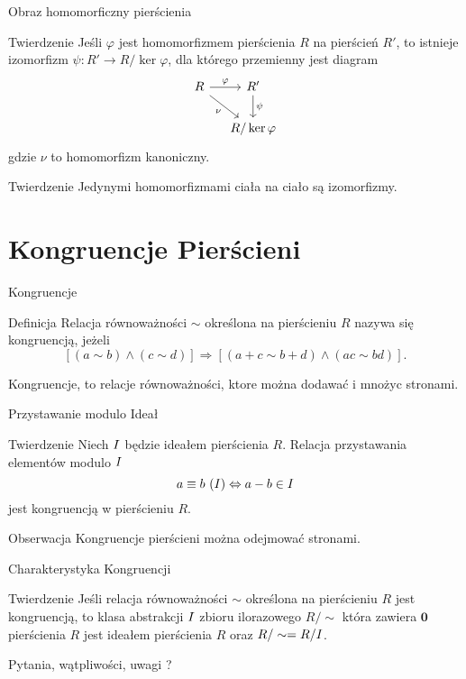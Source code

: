 \documentclass{beamer}
\newcommand{\zero}{\mathbf{0}}
\newcommand{\II}{\mathnormal{I}}
\let\phi\varphi
\begin{document}
\begin{frame}{Obraz homomorficzny pierścienia}
    \begin{block}{Twierdzenie}
        Jeśli $\phi$ jest homomorfizmem pierścienia $R$ na pierścień $R'$, to istnieje izomorfizm $\psi : R' \rightarrow R/\ker\phi$,
        dla którego przemienny jest diagram 
        $$
            \begin{tikzcd}[ampersand replacement=\&, column sep=small]
                R \arrow[r, "\phi"]  \arrow[rd, "\nu"'] \& R' \arrow[d, "\psi"] \\
                \& R / \ker \phi
            \end{tikzcd}
        $$   
        gdzie $\nu$ to homomorfizm kanoniczny.
    \end{block}
    \pause
    \begin{block}{Twierdzenie}
        Jedynymi homomorfizmami ciała na ciało są izomorfizmy. 
    \end{block}
\end{frame}

\section{Kongruencje Pierścieni}
\begin{frame}{Kongruencje}
    \begin{block}{Definicja}
        Relacja równoważności $\sim$ określona na pierścieniu $R$ nazywa się \alert{kongruencją}, jeżeli 
        $$[(a \sim b) \land (c \sim d)] \Rightarrow [(a+c \sim b+d) \land (ac \sim bd)].$$
    \end{block}
    Kongruencje, to relacje równoważności, ktore można dodawać i mnożyc stronami.
\end{frame}

\begin{frame}{Przystawanie modulo Ideał}
    \begin{block}{Twierdzenie}
        Niech $\II$ będzie ideałem pierścienia $R$. Relacja przystawania elementów modulo $\II$
        $$ a \equiv b \ (\II) \Leftrightarrow a - b \in \II$$ 
        jest kongruencją w pierścieniu $R$. 
    \end{block}
    \pause
    \begin{alertblock}{Obserwacja}
        Kongruencje pierścieni można odejmować stronami. 
    \end{alertblock}
\end{frame}

\begin{frame}{Charakterystyka Kongruencji}
    \begin{block}{Twierdzenie}
        Jeśli relacja równoważności $\sim$ określona na pierścieniu $R$ jest kongruencją, to klasa abstrakcji $\II$ zbioru ilorazowego $R/\sim$ która zawiera $\zero$ pierścienia $R$ jest ideałem pierścienia $R$ oraz $R/\sim = R/\II$.
    \end{block}
\end{frame}

\begin{frame}
    \centering 
    \LARGE Pytania, wątpliwości, uwagi ? 
\end{frame}
\end{document}
